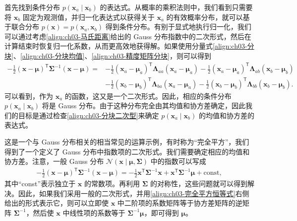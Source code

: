 \documentclass[../../main.tex]{subfiles}
\begin{document}
首先找到条件分布 $p(\boldsymbol{x}_{a}\mid\boldsymbol{x}_{b})$ 的表达式。从概率的乘积法则中，我们看到只需要将 $\boldsymbol{x}_{b}$ 固定为观测值，并归一化表达式以获得关于 $\boldsymbol{x}_{a}$ 的有效概率分布，就可以基于联合分布 $p(\boldsymbol{x})=p(\boldsymbol{x}_{a},\boldsymbol{x}_{b})$ 得到条件分布。有别于显式地执行归一化，我们可以通过考虑\eqref{align:ch03-马氏距离}给出的 Gauss 分布指数中的二次形式，然后在计算结束时恢复归一化系数，从而更高效地获得解。如果使用分量式\eqref{align:ch03-分块}、\eqref{align:ch03-分块均值}、\eqref{align:ch03-精度矩阵分块}，则可以得到
\begin{align}
-\frac{1}{2}(\boldsymbol{x}-\boldsymbol{\mu})^{\mathsf{T}}\boldsymbol{\Sigma}^{-1}(\boldsymbol{x}-\boldsymbol{\mu})=
&-\frac{1}{2}(\boldsymbol{x}_{a}-\boldsymbol{\mu}_{a})^{\mathsf{T}}\boldsymbol{\Lambda}_{aa}(\boldsymbol{x}_{a}-\boldsymbol{\mu}_{a})-\frac{1}{2}(\boldsymbol{x}_{a}-\boldsymbol{\mu}_{a})^{\mathsf{T}}\boldsymbol{\Lambda}_{ab}(\boldsymbol{x}_{b}-\boldsymbol{\mu}_{b})\nonumber\\
&-\frac{1}{2}(\boldsymbol{x}_{b}-\boldsymbol{\mu}_{b})^{\mathsf{T}}\boldsymbol{\Lambda}_{ba}(\boldsymbol{x}_{a}-\boldsymbol{\mu}_{a})-\frac{1}{2}(\boldsymbol{x}_{b}-\boldsymbol{\mu}_{b})^{\mathsf{T}}\boldsymbol{\Lambda}_{bb}(\boldsymbol{x}_{b}-\boldsymbol{\mu}_{b}).
\label{align:ch03-分块二次型}
\end{align}
可以看到，作为 $\boldsymbol{x}_{a}$ 的函数，这又是一个二次形式。因此，相应的条件分布 $p(\boldsymbol{x}_{a}\mid\boldsymbol{x}_{b})$ 将是 Gauss 分布。由于这种分布完全由其均值和协方差确定，因此我们的目标是通过检查\eqref{align:ch03-分块二次型}来确定 $p(\boldsymbol{x}_{a}\mid\boldsymbol{x}_{b})$ 的均值和协方差的表达式。

这是一个与 Gauss 分布相关的相当常见的运算示例，有时称为“完全平方”，我们得到了一个定义了 Gauss 分布中指数项的二次形式。我们需要确定相应的均值和协方差。注意，一般 Gauss 分布 $\mathcal{N}(\boldsymbol{x}\mid\boldsymbol{\mu},\boldsymbol{\Sigma})$ 中的指数可以写成
\begin{align}
-\frac{1}{2}(\boldsymbol{x}-\boldsymbol{\mu})^{\mathsf{T}}\boldsymbol{\Sigma}^{-1}(\boldsymbol{x}-\boldsymbol{\mu})=-\frac{1}{2}\boldsymbol{x}^{\mathsf{T}}\boldsymbol{\Sigma}^{-1}\boldsymbol{x}+\boldsymbol{x}^{\mathsf{T}}\boldsymbol{\Sigma}^{-1}\boldsymbol{\mu}+\text{const},
\label{align:ch03-完全平方恒等式}
\end{align}
其中“const”表示独立于 $\boldsymbol{x}$ 的常数项。再利用 $\boldsymbol{\Sigma}$ 的对称性，这些问题就可以得到解决。因此，如果我们采用一般的二次形式，并用\eqref{align:ch03-完全平方恒等式}右侧给出的形式表示它，则可以立即使 $\boldsymbol{x}$ 中二阶项的系数矩阵等于协方差矩阵的逆矩阵 $\boldsymbol{\Sigma}^{-1}$，然后使 $\boldsymbol{x}$ 中线性项的系数等于 $\boldsymbol{\Sigma}^{-1}\boldsymbol{\mu}$，即可得到 $\boldsymbol{\mu}$。
\end{document}
